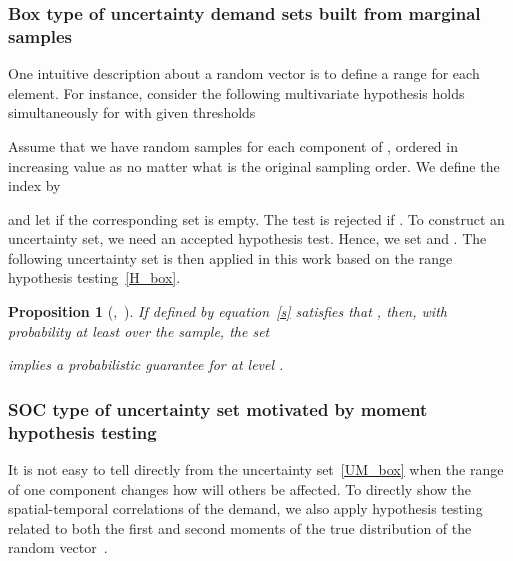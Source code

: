 \documentclass[10pt,twocolumn,twoside,english]{IEEEtran}
\newtheorem{proposition}{Proposition}
\begin{document}
\subsubsection{Box type of uncertainty demand sets built from marginal samples}
\label{box_uncertain}
One intuitive description about a random vector is to define a range for each element. For instance, consider the following multivariate hypothesis holds simultaneously for  with given thresholds ~\cite{N_1970} 




Assume that we have  random samples for each component  of , ordered in increasing value as  no matter what is the original sampling order. We define the index  by
\footnotesize

\normalsize
and let  if the corresponding set is empty. 
The test  is rejected if . To construct an uncertainty set, we need an accepted hypothesis test. Hence, we set  and . The following uncertainty set is then applied in this work based on the range hypothesis testing~\eqref{H_box}.
\begin{proposition}[\cite{datad_robust},~\cite{N_1970}]
If  defined by equation~\eqref{s} satisfies that , then, with probability at least  over the sample, the set

implies a probabilistic guarantee for  at level . 
\label{theorem_7}
\end{proposition}

\subsubsection{SOC type of uncertainty set motivated by moment hypothesis testing}\label{soc_uncertain}
It is not easy to tell directly from the uncertainty set~\eqref{UM_box} when the range of one component changes how will others be affected. To directly show the spatial-temporal correlations of the demand, we also apply hypothesis testing related to both the first and second moments of the true distribution  of the random vector~\cite{SC_2003}. 
\end{document}
